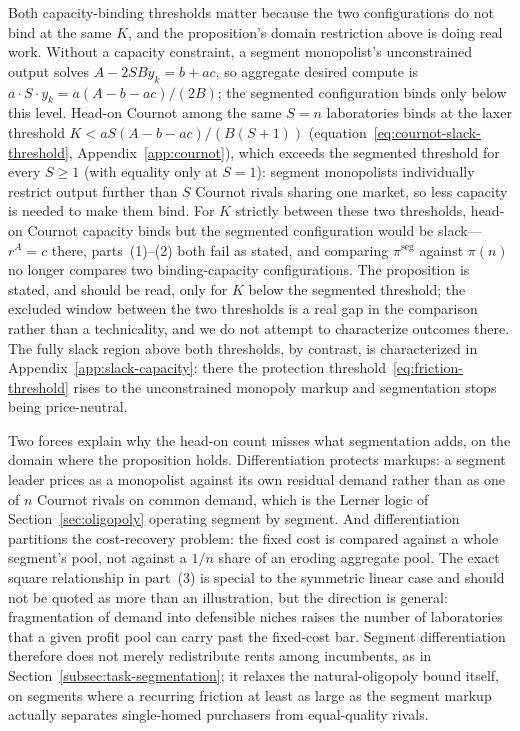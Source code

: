 \documentclass[11pt]{article}
\begin{document}
Both capacity-binding thresholds matter because the two configurations do not bind at the same $K$, and the proposition's domain restriction above is doing real work. Without a capacity constraint, a segment monopolist's unconstrained output solves $A-2SBy_k=b+ac$, so aggregate desired compute is $a\cdot S\cdot y_k=a(A-b-ac)/(2B)$; the segmented configuration binds only below this level. Head-on Cournot among the same $S=n$ laboratories binds at the laxer threshold $K<aS(A-b-ac)/(B(S+1))$ (equation~\eqref{eq:cournot-slack-threshold}, Appendix~\ref{app:cournot}), which exceeds the segmented threshold for every $S\geq1$ (with equality only at $S=1$): segment monopolists individually restrict output further than $S$ Cournot rivals sharing one market, so less capacity is needed to make them bind. For $K$ strictly between these two thresholds, head-on Cournot capacity binds but the segmented configuration would be slack---$r^A=c$ there, parts~(1)--(2) both fail as stated, and comparing $\pi^{\mathrm{seg}}$ against $\pi(n)$ no longer compares two binding-capacity configurations. The proposition is stated, and should be read, only for $K$ below the segmented threshold; the excluded window between the two thresholds is a real gap in the comparison rather than a technicality, and we do not attempt to characterize outcomes there. The fully slack region above both thresholds, by contrast, is characterized in Appendix~\ref{app:slack-capacity}: there the protection threshold~\eqref{eq:friction-threshold} rises to the unconstrained monopoly markup and segmentation stops being price-neutral.

Two forces explain why the head-on count misses what segmentation adds, on the domain where the proposition holds. Differentiation protects markups: a segment leader prices as a monopolist against its own residual demand rather than as one of $n$ Cournot rivals on common demand, which is the Lerner logic of Section~\ref{sec:oligopoly} operating segment by segment. And differentiation partitions the cost-recovery problem: the fixed cost is compared against a whole segment's pool, not against a $1/n$ share of an eroding aggregate pool. The exact square relationship in part~(3) is special to the symmetric linear case and should not be quoted as more than an illustration, but the direction is general: fragmentation of demand into defensible niches raises the number of laboratories that a given profit pool can carry past the fixed-cost bar. Segment differentiation therefore does not merely redistribute rents among incumbents, as in Section~\ref{subsec:task-segmentation}; it relaxes the natural-oligopoly bound itself, on segments where a recurring friction at least as large as the segment markup actually separates single-homed purchasers from equal-quality rivals.
\end{document}
